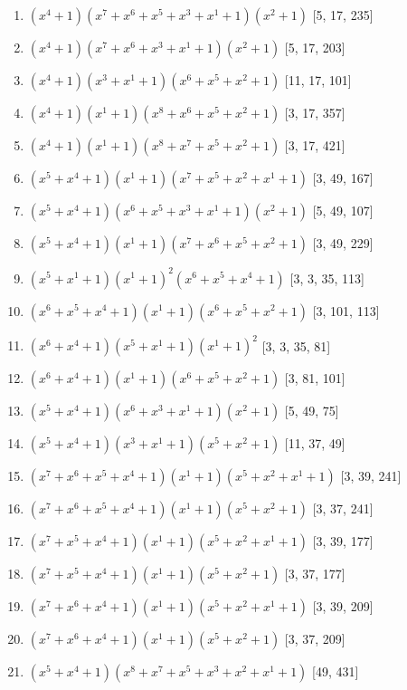 \documentclass[10pt,twocolumn]{article}
\begin{document}
\begin{enumerate}
\item $(x^{4} + 1)(x^{7} + x^{6} + x^{5} + x^{3} + x^{1} + 1)(x^{2} + 1)$  [5, 17, 235]
\item $(x^{4} + 1)(x^{7} + x^{6} + x^{3} + x^{1} + 1)(x^{2} + 1)$  [5, 17, 203]
\item $(x^{4} + 1)(x^{3} + x^{1} + 1)(x^{6} + x^{5} + x^{2} + 1)$  [11, 17, 101]
\item $(x^{4} + 1)(x^{1} + 1)(x^{8} + x^{6} + x^{5} + x^{2} + 1)$  [3, 17, 357]
\item $(x^{4} + 1)(x^{1} + 1)(x^{8} + x^{7} + x^{5} + x^{2} + 1)$  [3, 17, 421]
\item $(x^{5} + x^{4} + 1)(x^{1} + 1)(x^{7} + x^{5} + x^{2} + x^{1} + 1)$  [3, 49, 167]
\item $(x^{5} + x^{4} + 1)(x^{6} + x^{5} + x^{3} + x^{1} + 1)(x^{2} + 1)$  [5, 49, 107]
\item $(x^{5} + x^{4} + 1)(x^{1} + 1)(x^{7} + x^{6} + x^{5} + x^{2} + 1)$  [3, 49, 229]
\item $(x^{5} + x^{1} + 1)(x^{1} + 1)^{2}(x^{6} + x^{5} + x^{4} + 1)$  [3, 3, 35, 113]
\item $(x^{6} + x^{5} + x^{4} + 1)(x^{1} + 1)(x^{6} + x^{5} + x^{2} + 1)$  [3, 101, 113]
\item $(x^{6} + x^{4} + 1)(x^{5} + x^{1} + 1)(x^{1} + 1)^{2}$  [3, 3, 35, 81]
\item $(x^{6} + x^{4} + 1)(x^{1} + 1)(x^{6} + x^{5} + x^{2} + 1)$  [3, 81, 101]
\item $(x^{5} + x^{4} + 1)(x^{6} + x^{3} + x^{1} + 1)(x^{2} + 1)$  [5, 49, 75]
\item $(x^{5} + x^{4} + 1)(x^{3} + x^{1} + 1)(x^{5} + x^{2} + 1)$  [11, 37, 49]
\item $(x^{7} + x^{6} + x^{5} + x^{4} + 1)(x^{1} + 1)(x^{5} + x^{2} + x^{1} + 1)$  [3, 39, 241]
\item $(x^{7} + x^{6} + x^{5} + x^{4} + 1)(x^{1} + 1)(x^{5} + x^{2} + 1)$  [3, 37, 241]
\item $(x^{7} + x^{5} + x^{4} + 1)(x^{1} + 1)(x^{5} + x^{2} + x^{1} + 1)$  [3, 39, 177]
\item $(x^{7} + x^{5} + x^{4} + 1)(x^{1} + 1)(x^{5} + x^{2} + 1)$  [3, 37, 177]
\item $(x^{7} + x^{6} + x^{4} + 1)(x^{1} + 1)(x^{5} + x^{2} + x^{1} + 1)$  [3, 39, 209]
\item $(x^{7} + x^{6} + x^{4} + 1)(x^{1} + 1)(x^{5} + x^{2} + 1)$  [3, 37, 209]
\item $(x^{5} + x^{4} + 1)(x^{8} + x^{7} + x^{5} + x^{3} + x^{2} + x^{1} + 1)$  [49, 431]

\end{enumerate}
\end{document}
